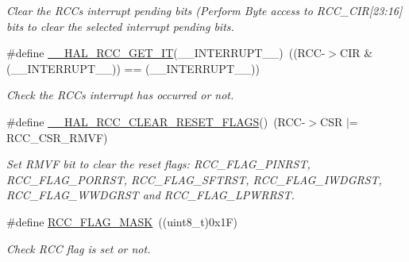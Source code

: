 \begin{DoxyCompactItemize}
\begin{DoxyCompactList}\small\item\em Clear the R\+CC\textquotesingle{}s interrupt pending bits (Perform Byte access to R\+C\+C\+\_\+\+C\+IR\mbox{[}23\+:16\mbox{]} bits to clear the selected interrupt pending bits. \end{DoxyCompactList}\item 
\#define \mbox{\hyperlink{group___r_c_c___flags___interrupts___management_ga134af980b892f362c05ae21922cd828d}{\+\_\+\+\_\+\+H\+A\+L\+\_\+\+R\+C\+C\+\_\+\+G\+E\+T\+\_\+\+IT}}(\+\_\+\+\_\+\+I\+N\+T\+E\+R\+R\+U\+P\+T\+\_\+\+\_\+)~((R\+CC-\/$>$C\+IR \& (\+\_\+\+\_\+\+I\+N\+T\+E\+R\+R\+U\+P\+T\+\_\+\+\_\+)) == (\+\_\+\+\_\+\+I\+N\+T\+E\+R\+R\+U\+P\+T\+\_\+\+\_\+))
\begin{DoxyCompactList}\small\item\em Check the R\+CC\textquotesingle{}s interrupt has occurred or not. \end{DoxyCompactList}\item 
\mbox{\label{group___r_c_c___flags___interrupts___management_gaf28c11b36035ef1e27883ff7ee2c46b0}} 
\#define \mbox{\hyperlink{group___r_c_c___flags___interrupts___management_gaf28c11b36035ef1e27883ff7ee2c46b0}{\+\_\+\+\_\+\+H\+A\+L\+\_\+\+R\+C\+C\+\_\+\+C\+L\+E\+A\+R\+\_\+\+R\+E\+S\+E\+T\+\_\+\+F\+L\+A\+GS}}()~(R\+CC-\/$>$C\+SR $\vert$= R\+C\+C\+\_\+\+C\+S\+R\+\_\+\+R\+M\+VF)
\begin{DoxyCompactList}\small\item\em Set R\+M\+VF bit to clear the reset flags\+: R\+C\+C\+\_\+\+F\+L\+A\+G\+\_\+\+P\+I\+N\+R\+ST, R\+C\+C\+\_\+\+F\+L\+A\+G\+\_\+\+P\+O\+R\+R\+ST, R\+C\+C\+\_\+\+F\+L\+A\+G\+\_\+\+S\+F\+T\+R\+ST, R\+C\+C\+\_\+\+F\+L\+A\+G\+\_\+\+I\+W\+D\+G\+R\+ST, R\+C\+C\+\_\+\+F\+L\+A\+G\+\_\+\+W\+W\+D\+G\+R\+ST and R\+C\+C\+\_\+\+F\+L\+A\+G\+\_\+\+L\+P\+W\+R\+R\+ST. \end{DoxyCompactList}\item 
\#define \mbox{\hyperlink{group___r_c_c___flags___interrupts___management_ga80017c6bf8a5c6f53a1a21bb8db93a82}{R\+C\+C\+\_\+\+F\+L\+A\+G\+\_\+\+M\+A\+SK}}~((uint8\+\_\+t)0x1\+F)
\begin{DoxyCompactList}\small\item\em Check R\+CC flag is set or not. \end{DoxyCompactList}\item 
\mbox{\label{group___r_c_c___flags___interrupts___management_gae2d7d461630562bf2a2ddb31b1f96449}} 

\end{DoxyCompactItemize}
